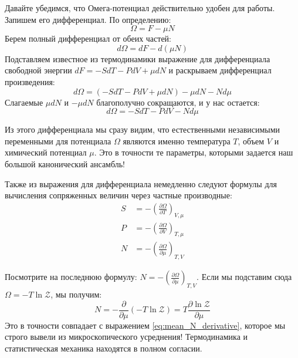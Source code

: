 \documentclass[../general/general]{subfiles}
\begin{document}
Давайте убедимся, что Омега-потенциал действительно удобен для работы. Запишем его дифференциал. По определению:
\begin{equation*}
    \Omega = F - \mu N
\end{equation*}
Берем полный дифференциал от обеих частей:
\begin{equation*}
    d\Omega = dF - d(\mu N)
\end{equation*}
Подставляем известное из термодинамики выражение для дифференциала свободной энергии $dF = -S dT - P dV + \mu dN$ и раскрываем дифференциал произведения:
\begin{equation*}
    d\Omega = (-S dT - P dV + \mu dN) - \mu dN - N d\mu
\end{equation*}
Слагаемые $\mu dN$ и $-\mu dN$ благополучно сокращаются, и у нас остается:
\begin{equation}
    d\Omega = -S dT - P dV - N d\mu
    \label{eq:dOmega}
\end{equation}

Из этого дифференциала мы сразу видим, что естественными независимыми переменными для потенциала $\Omega$ являются именно температура $T$, объем $V$ и химический потенциал $\mu$. Это в точности те параметры, которыми задается наш большой канонический ансамбль! 

Также из выражения для дифференциала немедленно следуют формулы для вычисления сопряженных величин через частные производные:
\begin{align*}
    S &= -\left( \frac{\partial \Omega}{\partial T} \right)_{V, \mu} \\
    P &= -\left( \frac{\partial \Omega}{\partial V} \right)_{T, \mu} \\
    N &= -\left( \frac{\partial \Omega}{\partial \mu} \right)_{T, V}
\end{align*}

Посмотрите на последнюю формулу: $N = -\left( \frac{\partial \Omega}{\partial \mu} \right)_{T, V}$. Если мы подставим сюда $\Omega = -T \ln \mathcal{Z}$, мы получим:
\begin{equation*}
    N = -\frac{\partial}{\partial \mu} (-T \ln \mathcal{Z}) = T \frac{\partial \ln \mathcal{Z}}{\partial \mu}
\end{equation*}
Это в точности совпадает с выражением \eqref{eq:mean_N_derivative}, которое мы строго вывели из микроскопического усреднения! Термодинамика и статистическая механика находятся в полном согласии.

\end{document}
